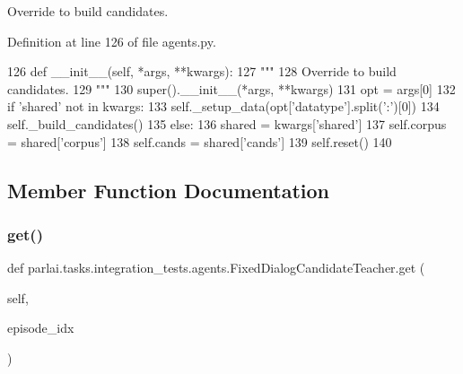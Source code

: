 \begin{DoxyVerb}Override to build candidates.
\end{DoxyVerb}
 

Definition at line 126 of file agents.\+py.


\begin{DoxyCode}
126     \textcolor{keyword}{def }\_\_init\_\_(self, *args, **kwargs):
127         \textcolor{stringliteral}{"""}
128 \textcolor{stringliteral}{        Override to build candidates.}
129 \textcolor{stringliteral}{        """}
130         super().\_\_init\_\_(*args, **kwargs)
131         opt = args[0]
132         \textcolor{keywordflow}{if} \textcolor{stringliteral}{'shared'} \textcolor{keywordflow}{not} \textcolor{keywordflow}{in} kwargs:
133             self.\_setup\_data(opt[\textcolor{stringliteral}{'datatype'}].split(\textcolor{stringliteral}{':'})[0])
134             self.\_build\_candidates()
135         \textcolor{keywordflow}{else}:
136             shared = kwargs[\textcolor{stringliteral}{'shared'}]
137             self.corpus = shared[\textcolor{stringliteral}{'corpus'}]
138             self.cands = shared[\textcolor{stringliteral}{'cands'}]
139         self.reset()
140 
\end{DoxyCode}


\subsection{Member Function Documentation}
\mbox{\label{classparlai_1_1tasks_1_1integration__tests_1_1agents_1_1FixedDialogCandidateTeacher_a933e942087017cb09e64ca1a8b6323b0}} 
\subsubsection{\texorpdfstring{get()}{get()}}
{\footnotesize\ttfamily def parlai.\+tasks.\+integration\+\_\+tests.\+agents.\+Fixed\+Dialog\+Candidate\+Teacher.\+get (\begin{DoxyParamCaption}\item[{}]{self,  }\item[{}]{episode\+\_\+idx }\end{DoxyParamCaption})}



